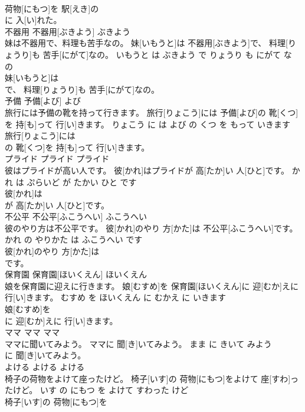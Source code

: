 \documentclass[8pt]{extreport}
\begin{document}
\begin{CJK}{UTF8}{min}
\\	荷物[にもつ]を 駅[えき]の
\\	に 入[い]れた。			
\\	不器用	不器用[ぶきよう]	ぶきよう	
\\	妹は不器用で、料理も苦手なの。	妹[いもうと]は 不器用[ぶきよう]で、 料理[りょうり]も 苦手[にがて]なの。	いもうと は ぶきよう で りょうり も にがて な の	
\\	妹[いもうと]は
\\	で、 料理[りょうり]も 苦手[にがて]なの。			
\\	予備	予備[よび]	よび	
\\	旅行には予備の靴を持って行きます。	旅行[りょこう]には 予備[よび]の 靴[くつ]を 持[も]って 行[い]きます。	りょこう に は よび の くつ を もって いきます	
\\	旅行[りょこう]には
\\	の 靴[くつ]を 持[も]って 行[い]きます。			
\\	プライド	プライド	プライド	
\\	彼はプライドが高い人です。	彼[かれ]はプライドが 高[たか]い 人[ひと]です。	かれ は ぷらいど が たかい ひと です	
\\	彼[かれ]は
\\	が 高[たか]い 人[ひと]です。			
\\	不公平	不公平[ふこうへい]	ふこうへい	
\\	彼のやり方は不公平です。	彼[かれ]のやり 方[かた]は 不公平[ふこうへい]です。	かれ の やりかた は ふこうへい です	
\\	彼[かれ]のやり 方[かた]は
\\	です。			
\\	保育園	保育園[ほいくえん]	ほいくえん	
\\	娘を保育園に迎えに行きます。	娘[むすめ]を 保育園[ほいくえん]に 迎[むか]えに 行[い]きます。	むすめ を ほいくえん に むかえ に いきます	
\\	娘[むすめ]を
\\	に 迎[むか]えに 行[い]きます。			
\\	ママ	ママ	ママ	
\\	ママに聞いてみよう。	ママに 聞[き]いてみよう。	まま に きいて みよう	
\\	に 聞[き]いてみよう。			
\\	よける	よける	よける	
\\	椅子の荷物をよけて座ったけど。	椅子[いす]の 荷物[にもつ]をよけて 座[すわ]ったけど。	いす の にもつ を よけて すわった けど	
\\	椅子[いす]の 荷物[にもつ]を

\end{CJK}
\end{document}
